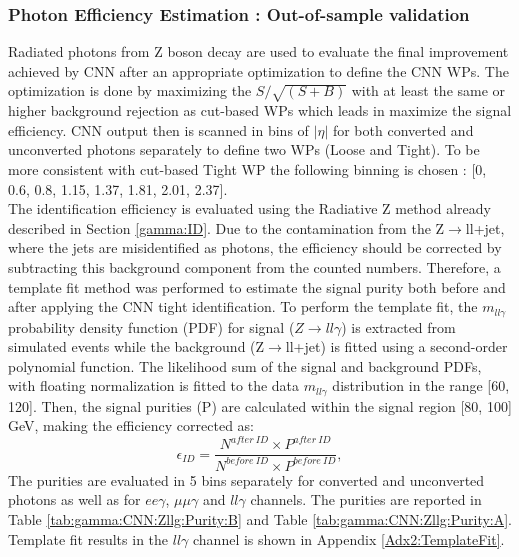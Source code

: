 \subsubsection{Photon Efficiency Estimation : Out-of-sample validation}
\label{gamma:CNN:Zllg}
Radiated photons from Z boson decay are used to evaluate the final improvement achieved by CNN after an appropriate optimization to define the CNN WPs. The optimization is done by maximizing the $S/\sqrt{(S+B)}$ with at least the same or higher background rejection as cut-based WPs which leads in maximize the signal efficiency. CNN output then is scanned in bins of $|\eta|$ for both converted and unconverted photons separately to define two WPs (Loose and Tight). To be more consistent with cut-based Tight WP the following binning is chosen : [0, 0.6, 0.8, 1.15, 1.37, 1.81, 2.01, 2.37]. \\
The identification efficiency is evaluated using the Radiative Z method already described in Section \ref{gamma:ID}. Due to the contamination from the Z$\rightarrow$ll+jet, where the jets are misidentified as photons, the efficiency should be corrected by subtracting this background component from the counted numbers. Therefore, a template fit method was performed to estimate the signal purity both before and after applying the CNN tight identification. To perform the template fit, the $m_{ll\gamma}$ probability density function (PDF) for signal ($Z\rightarrow ll\gamma$) is extracted from simulated events while the background (Z$\rightarrow$ll+jet) is fitted using a second-order polynomial function. The likelihood sum of the signal and background PDFs, with floating normalization is fitted to the data $m_{ll\gamma}$ distribution in the range [60, 120]. Then, the signal purities (P) are calculated within the signal region [80, 100] GeV, making the efficiency corrected as: 
\begin{equation}
    \epsilon_{ID} = \frac{N^{after \ ID}\times P^{after \ ID}}{N^{before \ ID} \times P^{before \ ID}},
\end{equation}
The purities are evaluated in 5 \pT bins separately for converted and unconverted photons as well as for $ee\gamma$, $\mu\mu\gamma$ and $ll\gamma$ channels. The purities are reported in Table \ref{tab:gamma:CNN:Zllg:Purity:B} and Table \ref{tab:gamma:CNN:Zllg:Purity:A}. Template fit results in the $ll\gamma$ channel is shown in Appendix \ref{Adx2:TemplateFit}.

